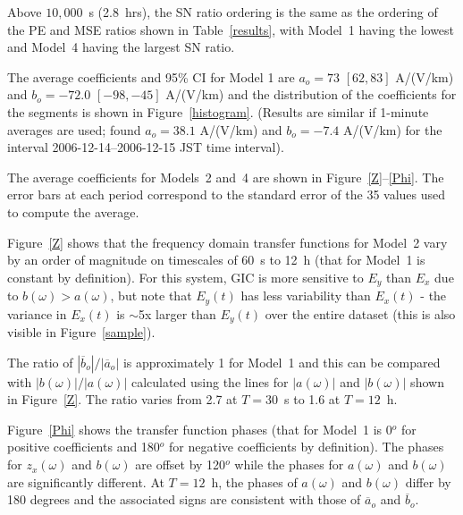 \documentclass[draft,linenumbers]{agujournal2018}
\begin{document}
Above $10,000$~s (2.8~hrs), the SN ratio ordering is the same as the ordering of the PE and MSE ratios shown in Table~\ref{results}, with Model~1 having the lowest and Model~4 having the largest SN ratio. 

The average coefficients and 95\% CI for Model 1 are $a_o = 73$ $[62,83]$ A/(V/km) and $b_o = -72.0$ $[-98,-45]$ A/(V/km) and the distribution of the coefficients for the segments is shown in Figure~\ref{histogram}. (Results are similar if 1-minute averages are used; \cite{Watari2015} found $a_o=38.1$ A/(V/km) and $b_o=-7.4$ A/(V/km) for the interval 2006-12-14--2006-12-15 JST time interval). 

The average coefficients for Models~2 and~4 are shown in Figure~\ref{Z}--\ref{Phi}. The error bars at each period correspond to the standard error of the 35 values used to compute the average.

Figure~\ref{Z} shows that the frequency domain transfer functions for Model~2 vary by an order of magnitude on timescales of 60~s to 12~h (that for Model~1 is constant by definition). For this system, GIC is more sensitive to $E_y$ than $E_x$ due to $b(\omega) > a(\omega)$, but note that $E_y(t)$ has less variability than $E_x(t)$ - the variance in $E_x(t)$ is $\sim$5x larger than $E_y(t)$ over the entire dataset (this is also visible in Figure~\ref{sample}). 

The ratio of $|\overline{b}_o|/|\overline{a}_o|$ is approximately 1 for Model~1 and this can be compared with $|b(\omega)|/|a(\omega)|$ calculated using the lines for $|a(\omega)|$ and $|b(\omega)|$ shown in Figure~\ref{Z}. The ratio varies from 2.7 at $T=30$~s to 1.6 at $T=12$~h. 

Figure~\ref{Phi} shows the transfer function phases (that for Model~1 is 0$^o$ for positive coefficients and 180$^o$ for negative coefficients by definition). The phases for $z_x(\omega)$ and $b(\omega)$ are offset by 120$^o$ while the phases for $a(\omega)$ and $b(\omega)$ are significantly different. At $T=12$~h, the phases of $a(\omega)$ and $b(\omega)$ differ by 180 degrees and the associated signs are consistent with those of $\overline{a}_o$ and $\overline{b}_o$. 

 
\end{document}
